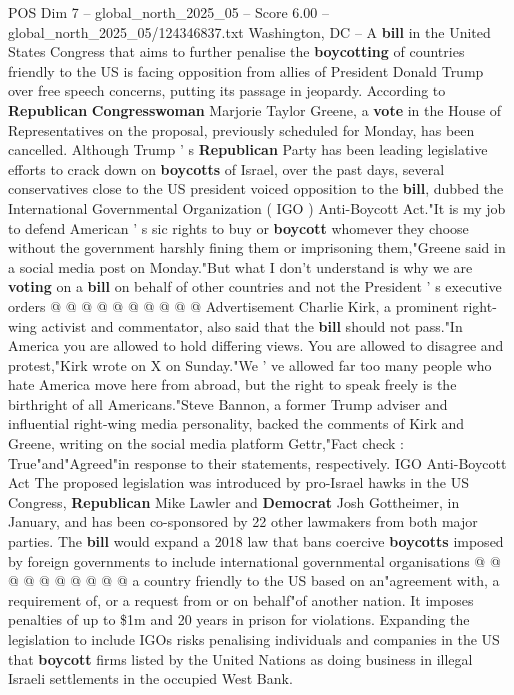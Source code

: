 \begin{textsample}{POS Dim 7 – global\_north\_2025\_05 – Score 6.00 – global\_north\_2025\_05/124346837.txt}  \label{ex:f7_pos_331}
Washington, DC -- A \textbf{bill} in the United States Congress that aims to further penalise the \textbf{boycotting} of countries friendly to the US is facing opposition from allies of President Donald Trump over free speech concerns, putting its passage in jeopardy.
According to \textbf{Republican} \textbf{Congresswoman} Marjorie Taylor Greene, a \textbf{vote} in the House of Representatives on the proposal, previously scheduled for Monday, has been cancelled.
Although Trump ' s \textbf{Republican} Party has been leading legislative efforts to crack down on \textbf{boycotts} of Israel, over the past days, several conservatives close to the US president voiced opposition to the \textbf{bill}, dubbed the International Governmental Organization ( IGO ) Anti-Boycott Act."It is my job to defend American ' s sic rights to buy or \textbf{boycott} whomever they choose without the government harshly fining them or imprisoning them,"Greene said in a social media post on Monday."But what I don't understand is why we are \textbf{voting} on a \textbf{bill} on behalf of other countries and not the President ' s executive orders @ @ @ @ @ @ @ @ @ @ Advertisement Charlie Kirk, a prominent right-wing activist and commentator, also said that the \textbf{bill} should not pass."In America you are allowed to hold differing views.
You are allowed to disagree and protest,"Kirk wrote on X on Sunday."We ' ve allowed far too many people who hate America move here from abroad, but the right to speak freely is the birthright of all Americans."Steve Bannon, a former Trump adviser and influential right-wing media personality, backed the comments of Kirk and Greene, writing on the social media platform Gettr,"Fact check : True"and"Agreed"in response to their statements, respectively.
IGO Anti-Boycott Act The proposed legislation was introduced by pro-Israel hawks in the US Congress, \textbf{Republican} Mike Lawler and \textbf{Democrat} Josh Gottheimer, in January, and has been co-sponsored by 22 other lawmakers from both major parties.
The \textbf{bill} would expand a 2018 law that bans coercive \textbf{boycotts} imposed by foreign governments to include international governmental organisations @ @ @ @ @ @ @ @ @ @ a country friendly to the US based on an"agreement with, a requirement of, or a request from or on behalf"of another nation.
It imposes penalties of up to \$1m and 20 years in prison for violations.
Expanding the legislation to include IGOs risks penalising individuals and companies in the US that \textbf{boycott} firms listed by the United Nations as doing business in illegal Israeli settlements in the occupied West Bank.

\end{textsample}
